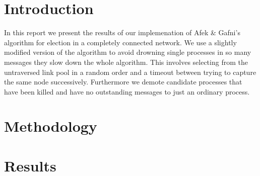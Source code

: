\documentclass[12pt]{article}
\begin{document}
\setlength\headheight{0.8in}
\setlength\topmargin{-0.6in}
\setlength\textheight{9.0in}
\setlength\parindent{0pt}

\section{Introduction}
In this report we present the results of our implemenation of Afek \& Gafni's algorithm for election in a completely connected network.
We use a slightly modified version of the algorithm to avoid drowning single processes in so many messages they slow down the
whole algorithm. This involves selecting from the untraversed link pool in a random order and a timeout between trying to capture
the same node successively. Furthermore we demote candidate processes that have been killed and have no outstanding messages
to just an ordinary process.

\section{Methodology}

\section{Results}
\end{document}
